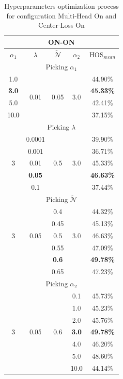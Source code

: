 \documentclass[10pt,twocolumn,letterpaper]{article}
\begin{document}
\begin{table}[b!]
  \centering
  \begin{tabular}[h]{||c|c|c|c||c||}
    \hline
    \multicolumn{5}{||c||}{ON-ON} \\
    \hline
    $\alpha_1$ & $\lambda$ & $\mathcal{\tilde N}$ & $\alpha_2$ & HOS$_{mean}$ \\
    \hline
    \hline
    \multicolumn{5}{||c||}{Picking $\alpha_1$} \\
    \hline
    1.0 & \multirow{4}{*}{0.01} & \multirow{4}{*}{0.05} & \multirow{4}{*}{3.0} & 44.90\% \\
    {\bf 3.0} & && & {\bf 45.33\%} \\
    5.0 & && & 42.41\% \\
    10.0 & && & 37.15\% \\
    \hline
    \hline
    \multicolumn{5}{||c||}{Picking $\lambda$} \\
    \hline
    \multirow{5}{*}{3} & 0.0001 & \multirow{5}{*}{0.5} & \multirow{5}{*}{3.0} & 39.90\% \\
    & 0.001 & & & 36.71\% \\
    & 0.01 & & & 45.33\% \\
    & {\bf 0.05 }& & & {\bf 46.63\%} \\
    & 0.1 & & & 37.44\% \\
    \hline
    \hline
    \multicolumn{5}{||c||}{Picking $\mathcal{\tilde N}$} \\
    \hline
    \multirow{5}{*}{3} & \multirow{5}{*}{0.05} & 0.4 & \multirow{5}{*}{3.0} & 44.32\% \\
    & & 0.45 & & 45.13\% \\
    & & 0.5 & & 46.63\% \\
    & & 0.55 & & 47.09\% \\
    & & {\bf 0.6} & & {\bf 49.78\%} \\
    & & 0.65 & & 47.23\% \\
    \hline
    \hline
    \multicolumn{5}{||c||}{Picking $\alpha_2$} \\
    \hline
    \multirow{7}{*}{3} & \multirow{7}{*}{0.05} & \multirow{7}{*}{0.6} & 0.1 & 45.73\% \\
    & & & 1.0 & 45.23\% \\
    & & & 2.0 & 45.76\% \\
    & & & {\bf 3.0} & {\bf 49.78\%} \\
    & & & 4.0 & 46.20\% \\
    & & & 5.0 & 48.60\% \\
    & & & 10.0 & 44.14\% \\
    \hline
  \end{tabular}
  \caption{\centering\label{tab:ablationonon} Hyperparameters optimization process for configuration Multi-Head On and Center-Loss On}
\end{table}
\end{document}

